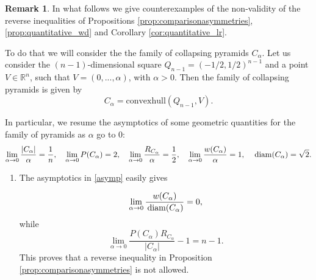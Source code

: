 \documentclass[oneside,a4paper,11pt,notitlepage]{article}
\newcommand{\abs}[1]{{\left|#1\right|}}
\theoremstyle{definition}
\theoremstyle{plain}
\theoremstyle{definition}
\newtheorem{oss}[esempio]{Remark}
\DeclareMathOperator{\diam}{\, \textup{diam}}
\begin{document}
\begin{oss}\label{rem:counterexamples}
    In what follows we give counterexamples of the non-validity of the reverse inequalities of Propositions 
\ref{prop:comparisonasymmetries}, \ref{prop:quantitative_wd} and Corollary  \ref{cor:quantitative_lr}. 

To do that we will consider the  the family of collapsing pyramids $C_\alpha$. Let us consider the $(n-1)$-dimensional square $Q_{n-1}=(-1/2,1/2)^{n-1}$ and a point $V\in \mathbb R^n$, such that $V=(0,...,\alpha)$, with $\alpha>0$. Then the family of collapsing pyramids is given by
\begin{equation*}
    C_\alpha=\text{convexhull}(Q_{n-1},V).
\end{equation*}

In particular, we resume the asymptotics of some geometric quantities for the family of pyramids as $\alpha$ go to 0:
\begin{equation}
    \label{asymp}
    \lim_{\alpha \to 0}\frac{\abs{C_\alpha}}{\alpha}=\frac 1 n, \quad \lim_{\alpha \to 0}P({C_\alpha})=2, \quad  \lim_{\alpha \to 0}\frac{R_{C_\alpha}}{\alpha}=\frac 1 2, \quad  \lim_{\alpha \to 0}\frac{w({C_\alpha})}{\alpha}=1, \quad \diam(C_\alpha)= \sqrt{2}.
\end{equation} 



\begin{enumerate}
    \item  The asymptotics in \eqref{asymp} easily gives

\begin{equation*}
         \lim_{\alpha\to 0}\frac{w(C_\alpha)}{\diam(C_\alpha)}=0,
    \end{equation*}
while
\begin{equation}\label{eq:betapyramid}
    \lim_{\alpha\to 0}\frac{P(C_\alpha)R_{C_\alpha}}{\abs{C_\alpha}}-1 = n-1.
\end{equation}
This proves that a reverse inequality in Proposition \ref{prop:comparisonasymmetries} is not allowed.



\end{enumerate}
\end{oss}
\end{document}
